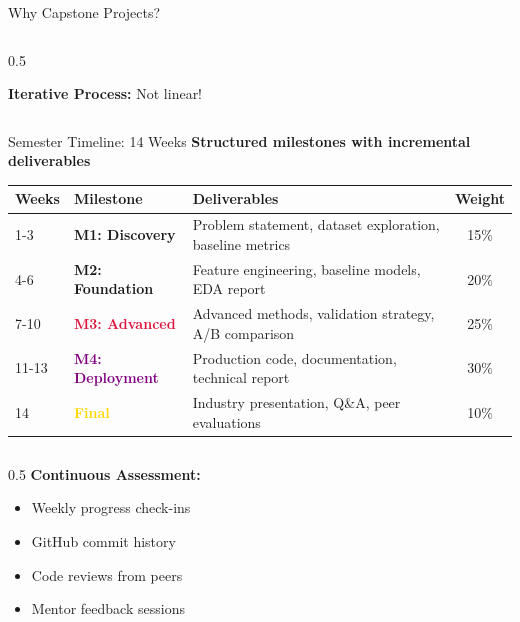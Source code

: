 \begin{frame}{Why Capstone Projects?}
\begin{columns}
\begin{column}{0.5\textwidth}
\begin{figure}
\end{figure}

\vspace{0.2cm}
\textbf{Iterative Process:} Not linear!
\end{column}
\end{columns}
\end{frame}


\begin{frame}{Semester Timeline: 14 Weeks}
\textbf{Structured milestones with incremental deliverables}

\begin{table}
\centering
\small
\begin{tabular}{|l|l|p{5cm}|c|}
\hline
\rowcolor{navyblue!20}
\textbf{Weeks} & \textbf{Milestone} & \textbf{Deliverables} & \textbf{Weight} \\
\hline
1-3 & \textcolor{forest}{\textbf{M1: Discovery}} & Problem statement, dataset exploration, baseline metrics & 15\% \\
\hline
4-6 & \textcolor{navyblue}{\textbf{M2: Foundation}} & Feature engineering, baseline models, EDA report & 20\% \\
\hline
7-10 & \textcolor{crimson}{\textbf{M3: Advanced}} & Advanced methods, validation strategy, A/B comparison & 25\% \\
\hline
11-13 & \textcolor{purple}{\textbf{M4: Deployment}} & Production code, documentation, technical report & 30\% \\
\hline
14 & \textcolor{gold}{\textbf{Final}} & Industry presentation, Q\&A, peer evaluations & 10\% \\
\hline
\end{tabular}
\end{table}

\vspace{0.4cm}

\begin{columns}
\begin{column}{0.5\textwidth}
\textbf{Continuous Assessment:}
\begin{itemize}
\item Weekly progress check-ins
\item GitHub commit history
\item Code reviews from peers
\item Mentor feedback sessions
\end{itemize}
\end{column}


\end{columns}
\end{frame}
